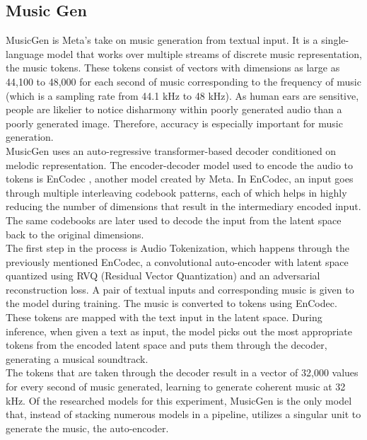 \documentclass[conference]{IEEEtran}
\begin{document}
\subsection{Music Gen}
{
MusicGen \cite{copet2023simple} is Meta’s take on music generation from textual input. It is a single-language model that works over multiple streams of discrete music representation, the music tokens. These tokens consist of vectors with dimensions as large as 44,100 to 48,000 for each second of music corresponding to the frequency of music (which is a sampling rate from 44.1 kHz to 48 kHz). As human ears are sensitive, people are likelier to notice disharmony within poorly generated audio than a poorly generated image. Therefore, accuracy is especially important for music generation.
\\

MusicGen uses an auto-regressive transformer-based decoder conditioned on melodic representation. The encoder-decoder model used to encode the audio to tokens is EnCodec \cite{defossez2022high}, another model created by Meta. In EnCodec, an input goes through multiple interleaving codebook patterns, each of which helps in highly reducing the number of dimensions that result in the intermediary encoded input. The same codebooks are later used to decode the input from the latent space back to the original dimensions.
\\

The first step in the process is Audio Tokenization, which happens through the previously mentioned EnCodec, a convolutional auto-encoder with latent space quantized using RVQ (Residual Vector Quantization) and an adversarial reconstruction loss. 
A pair of textual inputs and corresponding music is given to the model during training. The music is converted to tokens using EnCodec. These tokens are mapped with the text input in the latent space. During inference, when given a text as input, the model picks out the most appropriate tokens from the encoded latent space and puts them through the decoder, generating a musical soundtrack. 
\\

The tokens that are taken through the decoder result in a vector of 32,000 values for every second of music generated, learning to generate coherent music at 32 kHz. Of the researched models for this experiment, MusicGen is the only model that, instead of stacking numerous models in a pipeline, utilizes a singular unit to generate the music, the auto-encoder.
\\

}
\end{document}
